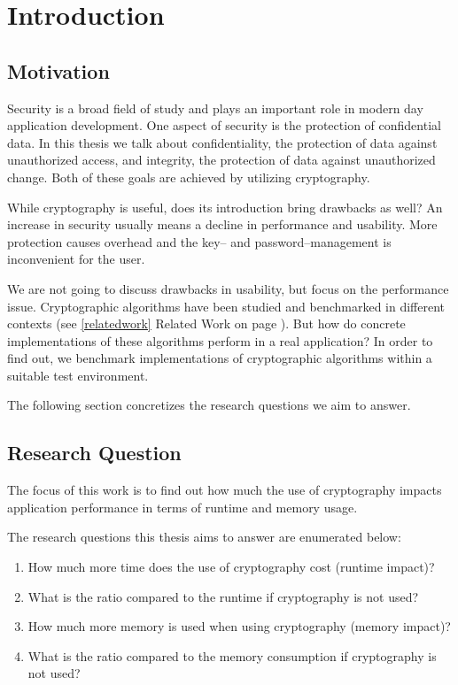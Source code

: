\chapter{Introduction}

\section{Motivation}

Security is a broad field of study and plays an important role in modern day application development.
One aspect of security is the protection of confidential data.
In this thesis we talk about confidentiality, the protection of data against unauthorized access, and integrity, the protection of data against unauthorized change.
Both of these goals are achieved by utilizing cryptography.

While cryptography is useful, does its introduction bring drawbacks as well?
An increase in security usually means a decline in performance and usability.
More protection causes overhead and the key-- and password--management is inconvenient for the user.

We are not going to discuss drawbacks in usability, but focus on the performance issue.
Cryptographic algorithms have been studied and benchmarked in different contexts (see \ref{relatedwork} Related Work on page \pageref{relatedwork}).
But how do concrete implementations of these algorithms perform in a real application?
In order to find out, we benchmark implementations of cryptographic algorithms within a suitable test environment.

The following section concretizes the research questions we aim to answer.

\section{Research Question}

The focus of this work is to find out how much the use of cryptography
impacts application performance in terms of runtime and memory
usage.

The research questions this thesis aims to answer are enumerated below:

\begin{enumerate}
\def\labelenumi{\arabic{enumi}.}
\tightlist
\item
  How much more time does the use of cryptography cost (runtime impact)?
\item
  What is the ratio compared to the runtime if cryptography is not used?
\item
  How much more memory is used when using cryptography (memory impact)?
\item
  What is the ratio compared to the memory consumption if cryptography
  is not used?
\end{enumerate}

